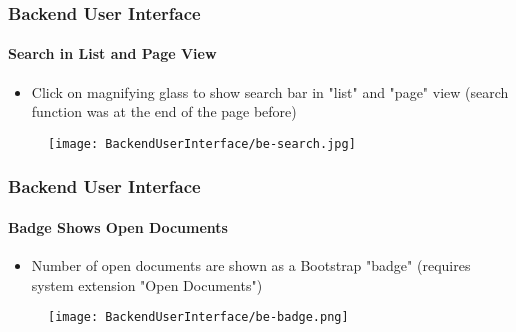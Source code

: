 
\begin{frame}[fragile]
	\frametitle{Backend User Interface}
	\framesubtitle{Search in List and Page View}

	\begin{itemize}
		\item Click on magnifying glass to show search bar in "list" and "page" view\newline
			(search function was at the end of the page before)
	\end{itemize}

	\begin{figure}
		\texttt{[image: BackendUserInterface/be-search.jpg]}
	\end{figure}

\end{frame}


\begin{frame}[fragile]
	\frametitle{Backend User Interface}
	\framesubtitle{Badge Shows Open Documents}

	\begin{itemize}
		\item Number of open documents are shown as a Bootstrap "badge"\newline
			(requires system extension "Open Documents")
	\end{itemize}
	\begin{figure}
		\texttt{[image: BackendUserInterface/be-badge.png]}
	\end{figure}

\end{frame}


